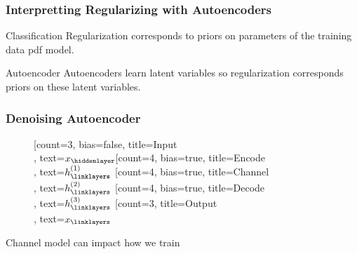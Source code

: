 \documentclass{beamer}
\begin{document}
\begin{frame}
	\frametitle{Interpretting Regularizing with Autoencoders}
	\begin{block}{Classification}
	Regularization corresponds to priors on parameters of the training data pdf model.
	\end{block}

	\begin{block}{Autoencoder}
		Autoencoders learn latent variables so regularization corresponds priors on these latent variables.
	\end{block}
\end{frame}


\begin{frame}[fragile, label=DNA]
	\frametitle{Denoising Autoencoder}
	\begin{figure}
		\begin{neuralnetwork}[height=4, nodespacing=10mm, layerspacing=20mm]
		\newcommand{\x}[2]{$x_#2$}
		\newcommand{\y}[2]{$\hat{x}_#2$}
		\newcommand{\hfirst}[2]{\small $h^{(1)}_#2$}
		\newcommand{\hsecond}[2]{\small $h^{(2)}_#2$}
		\newcommand{\hthird}[2]{\small $h^{(3)}_#2$}
		[count=3, bias=false, title=Input\\, text=\x]
		\hiddenlayer[count=4, bias=true, title=Encode\\, text=\hfirst] \linklayers
		\hiddenlayer[count=4, bias=true, title=Channel\\, text=\hsecond] \linklayers
		\hiddenlayer[count=4, bias=true, title=Decode\\, text=\hthird] \linklayers
		\outputlayer[count=3, title=Output\\, text=\x] \linklayers
	    \end{neuralnetwork}
	\end{figure}
	Channel model can impact how we train \cite{felix2018ofdm}
\end{frame}
\end{document}
